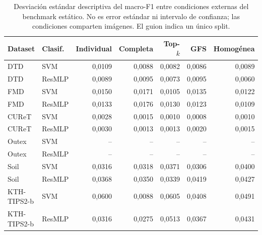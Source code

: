 \begin{table}[!htbp]
\centering\fontsize{8}{10}\selectfont
\caption{Desviación estándar descriptiva del macro-F1 entre condiciones externas del benchmark estático. No es error estándar ni intervalo de confianza; las condiciones comparten imágenes. El guion indica un único split.}
\label{tab:variabilidad-estatica}
\begin{tabular}{@{}llrrrrr@{}}
\toprule Dataset & Clasif. & Individual & Completa & Top-$k$ & GFS & Homogénea\\ \midrule
DTD & SVM & 0,0109 & 0,0088 & 0,0082 & 0,0086 & 0,0089\\
DTD & ResMLP & 0,0089 & 0,0095 & 0,0073 & 0,0095 & 0,0060\\
FMD & SVM & 0,0150 & 0,0171 & 0,0105 & 0,0135 & 0,0122\\
FMD & ResMLP & 0,0133 & 0,0176 & 0,0130 & 0,0123 & 0,0109\\
CUReT & SVM & 0,0028 & 0,0015 & 0,0010 & 0,0008 & 0,0010\\
CUReT & ResMLP & 0,0030 & 0,0013 & 0,0013 & 0,0020 & 0,0015\\
Outex & SVM & -- & -- & -- & -- & --\\
Outex & ResMLP & -- & -- & -- & -- & --\\
Soil & SVM & 0,0316 & 0,0318 & 0,0371 & 0,0306 & 0,0400\\
Soil & ResMLP & 0,0368 & 0,0350 & 0,0339 & 0,0419 & 0,0427\\
KTH-TIPS2-b & SVM & 0,0600 & 0,0088 & 0,0605 & 0,0408 & 0,0491\\
KTH-TIPS2-b & ResMLP & 0,0316 & 0,0275 & 0,0513 & 0,0367 & 0,0431\\
\bottomrule
\end{tabular}
\end{table}
